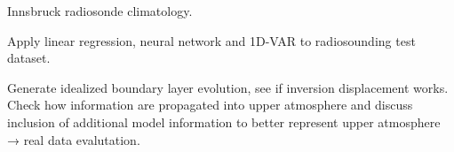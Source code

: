 \startsection[title=Training and Test Dataset]

    Innsbruck radiosonde climatology.

\stopsection


\startsection[title=Comparison of Retrievals and Radiosoundings]

    Apply linear regression, neural network and 1D-VAR to radiosounding test
    dataset.

\stopsection


\startsection[title=An Idealized Experiment with Time-Continuous Retrieval]

    Generate idealized boundary layer evolution, see if inversion displacement
    works. Check how information are propagated into upper atmosphere and
    discuss inclusion of additional model information to better represent upper
    atmosphere → real data evalutation.
    
\stopsection


